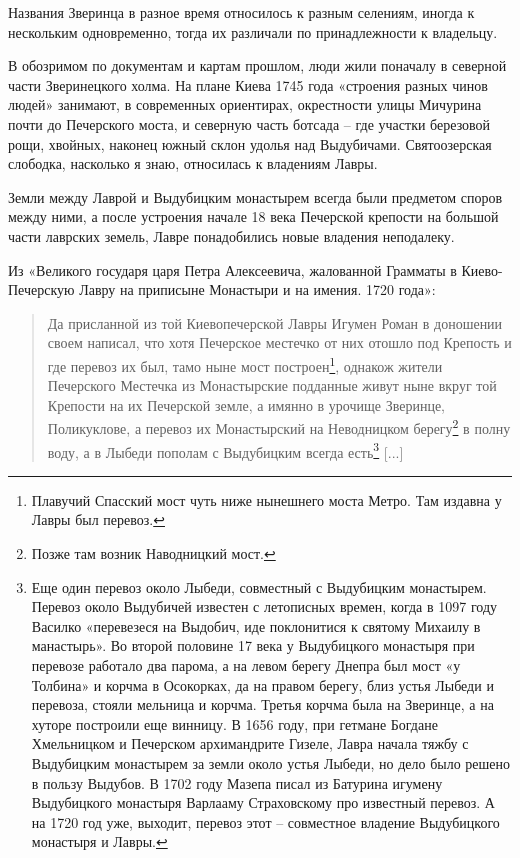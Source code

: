 Названия Зверинца в разное время относилось к разным селениям, иногда к нескольким одновременно, тогда их различали по принадлежности к владельцу.

В обозримом по документам и картам прошлом, люди жили поначалу в северной части Зверинецкого холма. На плане Киева 1745 года «строения разных чинов людей» занимают, в современных ориентирах, окрестности улицы Мичурина почти до Печерского моста, и северную часть ботсада – где участки березовой рощи, хвойных, наконец южный склон удолья над Выдубичами. Святоозерская слободка, насколько я знаю, относилась к владениям Лавры.

Земли между Лаврой и Выдубицким монастырем всегда были предметом споров между ними, а после устроения начале 18 века Печерской крепости на большой части лаврских земель, Лавре понадобились новые владения неподалеку.

Из «Великого государя царя Петра Алексеевича, жалованной Грамматы в Киево-Печерскую Лавру на приписыне Монастыри и на имения. 1720 года»:

\begin{quotation}
Да присланной из той Киевопечерской Лавры Игумен Роман в доношении своем написал, что хотя Печерское местечко от них отошло под Крепость и где перевоз их был, тамо ныне мост построен\footnote{Плавучий Спасский мост чуть ниже нынешнего моста Метро. Там издавна у Лавры был перевоз.}, однакож жители Печерского Местечка из Монастырские подданные живут ныне вкруг той Крепости на их Печерской земле, а имянно в урочище Зверинце, Поликуклове, а перевоз их Монастырский на Неводницком берегу\footnote{Позже там возник Наводницкий мост.} в полну воду, а в Лыбеди пополам с Выдубицким всегда есть\footnote{Еще один перевоз около Лыбеди, совместный с Выдубицким монастырем. Перевоз около Выдубичей известен с летописных времен, когда в 1097 году Василко «перевезеся на Выдобич, иде поклонитися к святому Михаилу в манастырь». Во второй половине 17 века у Выдубицкого монастыря при перевозе работало два парома, а на левом берегу Днепра был мост «у Толбина» и корчма в Осокорках, да на правом берегу, близ устья Лыбеди и перевоза, стояли мельница и корчма. Третья корчма была на Зверинце, а на хуторе построили еще винницу. В 1656 году, при гетмане Богдане Хмельницком и Печерском архимандрите Гизеле, Лавра начала тяжбу с Выдубицким монастырем за земли около устья Лыбеди, но дело было решено в пользу Выдубов. В 1702 году Мазепа писал из Батурина игумену Выдубицкого монастыря Варлааму Страховскому про известный перевоз. А на 1720 год уже, выходит, перевоз этот – совместное владение Выдубицкого монастыря и Лавры.} [...]
\end{quotation}
 
